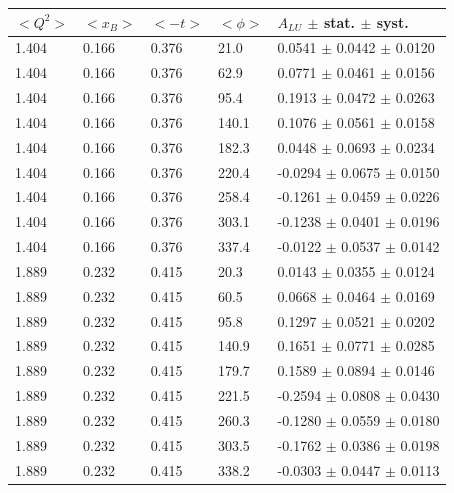 \begin{table}[!h]
   \begin{center}
      \begin{tabular}{||l|l|l|l|l||}
         \hline
 $<Q^{2}>$ & $<x_{B}>$ & $<-t>$ & $<\phi>$ & $A_{LU}$ $\pm$ stat. $\pm$ syst.\\
 \hline 
  1.404 & 0.166 & 0.376  &   21.0 &   0.0541 $\pm$  0.0442  $\pm$ 0.0120 \\
  1.404 & 0.166 & 0.376  &   62.9 &   0.0771 $\pm$  0.0461  $\pm$ 0.0156 \\
  1.404 & 0.166 & 0.376  &   95.4 &   0.1913 $\pm$  0.0472  $\pm$ 0.0263 \\
  1.404 & 0.166 & 0.376  &  140.1 &   0.1076 $\pm$  0.0561  $\pm$ 0.0158 \\
  1.404 & 0.166 & 0.376  &  182.3 &   0.0448 $\pm$  0.0693  $\pm$ 0.0234 \\
  1.404 & 0.166 & 0.376  &  220.4 &  -0.0294 $\pm$  0.0675  $\pm$ 0.0150 \\
  1.404 & 0.166 & 0.376  &  258.4 &  -0.1261 $\pm$  0.0459  $\pm$ 0.0226 \\
  1.404 & 0.166 & 0.376  &  303.1 &  -0.1238 $\pm$  0.0401  $\pm$ 0.0196 \\
  1.404 & 0.166 & 0.376  &  337.4 &  -0.0122 $\pm$  0.0537  $\pm$ 0.0142 \\
                                                                           
  \hline                                                              
  1.889 & 0.232 & 0.415  &   20.3 &   0.0143 $\pm$  0.0355  $\pm$ 0.0124 \\
  1.889 & 0.232 & 0.415  &   60.5 &   0.0668 $\pm$  0.0464  $\pm$ 0.0169 \\
  1.889 & 0.232 & 0.415  &   95.8 &   0.1297 $\pm$  0.0521  $\pm$ 0.0202 \\
  1.889 & 0.232 & 0.415  &  140.9 &   0.1651 $\pm$  0.0771  $\pm$ 0.0285 \\
  1.889 & 0.232 & 0.415  &  179.7 &   0.1589 $\pm$  0.0894  $\pm$ 0.0146 \\
  1.889 & 0.232 & 0.415  &  221.5 &  -0.2594 $\pm$  0.0808  $\pm$ 0.0430 \\
  1.889 & 0.232 & 0.415  &  260.3 &  -0.1280 $\pm$  0.0559  $\pm$ 0.0180 \\
  1.889 & 0.232 & 0.415  &  303.5 &  -0.1762 $\pm$  0.0386  $\pm$ 0.0198 \\
  1.889 & 0.232 & 0.415  &  338.2 &  -0.0303 $\pm$  0.0447  $\pm$ 0.0113 \\
  \hline                                                              
                                                                           

\end{tabular}
\end{center}
\end{table}
